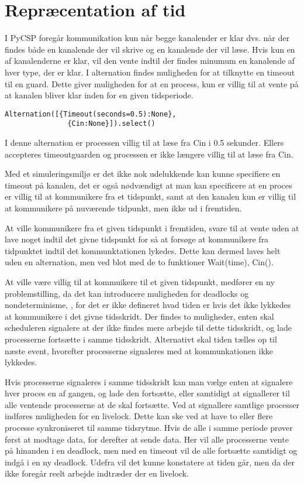\section{Repræcentation af tid}

I PyCSP foregår kommunikation kun når begge kanalender er klar dvs.
når der findes både en kanalende der vil skrive og en kanalende der vil læse. 
Hvis kun en af kanalenderne er klar, vil den vente indtil
der findes minumum en kanalende af hver type, der er klar. I alternation 
findes muligheden for at tilknytte en timeout til en guard. Dette
giver muligheden for at en process, kun er villig til at vente på at kanalen 
bliver klar inden for en given tidsperiode. 
\begin{lstlisting}[label=Timeout,
  caption=Timeout i Alternation (fra dokumentationen til PyCSP)]
  Alternation([{Timeout(seconds=0.5):None},
               {Cin:None}]).select()
\end{lstlisting} 

I denne alternation er processen villig til at læse fra Cin i 0.5 sekunder. 
Ellers accepteres timeoutguarden og processen er ikke længere villig til at 
læse fra Cin.

Med et simuleringsmiljø er det ikke nok udelukkende kan kunne specifiere en 
timeout på kanalen, det er også nødvændigt at man kan specificere at en proces 
er villig til at kommunikere fra et tidspunkt, samt at den kanalen kun er 
villig til at kommunikere på nuværende tidpunkt, men ikke ud i fremtiden. 

At ville kommunikere fra et given tidspunkt i fremtiden,  svare til at vente 
uden at lave noget indtil det givne tidspunkt for så at forsøge at kommunikere 
fra tidpunktet indtil det kommunktationen lykedes. Dette kan dermed laves helt 
uden en alternation, men ved blot med de to funktioner Wait(time), Cin(). 

At ville være villig til at kommuikere til et given tidspunkt, medfører en ny 
problemstilling, da det kan introducere muligheden for deadlocks og 
nondeterminisme, , for det er ikke defineret hvad 
tiden er hvis det ikke lykkedes at kommunikere i det givne tidsskridt. Der 
findes to muligheder, enten skal scheduleren signalere at der ikke findes mere 
arbejde til dette tidsskridt, og lade processerne fortsætte i samme 
tidsskridt. Alternativt skal tiden tælles op til næste event, hvorefter 
processerne signaleres med at kommunkationen ikke lykkedes. 

Hvis processerne signaleres i samme tidsskridt kan man vælge enten at 
signalere hver proces en af gangen, og lade den fortsætte, eller samtidigt at 
signallerer til alle ventende processerne at de skal fortsætte.
Ved at signallere samtlige processer indføres muligheden for en livelock. 
Dette kan ske ved at have to eller flere processe synkroniseret  til samme 
tidsrytme. Hvis de  alle i samme periode prøver først at modtage data, for 
derefter at sende data. Her vil alle processerne vente på hinanden i en 
deadlock, men med en timeout vil de alle fortsætte samtidigt og indgå i en ny 
deadlock. Udefra vil det kunne konstatere at tiden går, men da der ikke 
foregår reelt arbejde indtræder der en livelock. 

